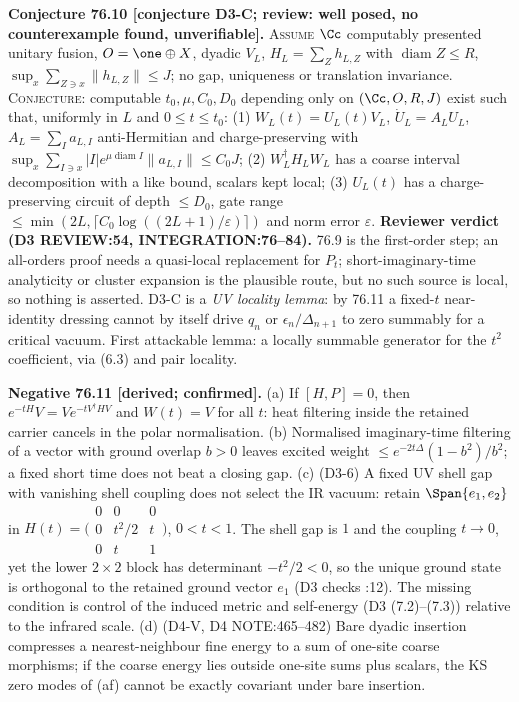 \textbf{Conjecture 76.10 [conjecture D3-C; review: well posed, no counterexample found, unverifiable].}  \textsc{Assume}
\(\Cc\) computably presented unitary fusion, \(O=\one\oplus X\), dyadic \(V_L\), \(H_L=\sum_Zh_{L,Z}\) with
\(\operatorname{diam}Z\le R\), \(\sup_x\sum_{Z\ni x}\|h_{L,Z}\|\le J\); no gap, uniqueness or translation invariance.
\textsc{Conjecture}: computable \(t_0,\mu,C_0,D_0\) depending only on \((\Cc,O,R,J)\) exist such that, uniformly in \(L\)
and \(0\le t\le t_0\): (1) \(W_L(t)=U_L(t)V_L\), \(\dot U_L=A_LU_L\), \(A_L=\sum_Ia_{L,I}\) anti-Hermitian and
charge-preserving with \(\sup_x\sum_{I\ni x}|I|e^{\mu\operatorname{diam}I}\|a_{L,I}\|\le C_0J\); (2)
\(W_L^\dagger H_LW_L\) has a coarse interval decomposition with a like bound, scalars kept local; (3) \(U_L(t)\) has a
charge-preserving circuit of depth \(\le D_0\), gate range \(\le\min(2L,\lceil C_0\log((2L+1)/\varepsilon)\rceil)\) and
norm error \(\varepsilon\).  \textbf{Reviewer verdict (D3 REVIEW:54, INTEGRATION:76--84).}  76.9 is the first-order
step; an all-orders proof needs a quasi-local replacement for \(P_t\); short-imaginary-time analyticity or cluster
expansion is the plausible route, but no such source is local, so nothing is asserted.  D3-C is a \emph{UV locality
lemma}: by 76.11 a fixed-\(t\) near-identity dressing cannot by itself drive \(q_n\) or \(\epsilon_n/\Delta_{n+1}\) to
zero summably for a critical vacuum.  First attackable lemma: a locally summable generator for the \(t^2\) coefficient,
via (6.3) and pair locality.

\textbf{Negative 76.11 [derived; confirmed].}
(a) If \([H,P]=0\), then \(e^{-tH}V=Ve^{-tV^\dagger HV}\) and \(W(t)=V\) for all \(t\): heat filtering inside the
retained carrier cancels in the polar normalisation.
(b) Normalised imaginary-time filtering of a vector with ground overlap \(b>0\) leaves excited weight
\(\le e^{-2t\Delta}(1-b^2)/b^2\); a fixed short time does not beat a closing gap.
(c) (D3-6) A fixed UV shell gap with vanishing shell coupling does not select the IR vacuum: retain
\(\Span\{e_1,e_2\}\) in \(H(t)=\bigl(\begin{smallmatrix}0&0&0\\0&t^2/2&t\\0&t&1\end{smallmatrix}\bigr)\), \(0<t<1\).  The
shell gap is \(1\) and the coupling \(t\to0\), yet the lower \(2\times2\) block has determinant \(-t^2/2<0\), so the
unique ground state is orthogonal to the retained ground vector \(e_1\) (D3 checks :12).  The missing
condition is control of the induced metric and self-energy (D3 (7.2)--(7.3)) relative to the infrared scale.
(d) (D4-V, D4 NOTE:465--482) Bare dyadic insertion compresses a nearest-neighbour fine energy to a sum of one-site
coarse morphisms; if the coarse energy lies outside one-site sums plus scalars, the KS zero modes of (af) cannot be
exactly covariant under bare insertion.

